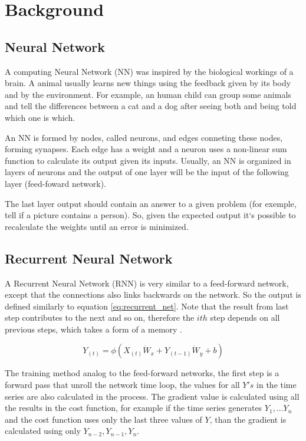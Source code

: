 \section{Background}
\label{sec:background}

\subsection{Neural Network}
A computing Neural Network (NN) was inspired by the biological workings of a brain. A animal usually learns new things using the feedback given by its body and by the environment. For example, an human child can group some animals and tell the differences between a cat and a dog after seeing both and being told which one is which.

An NN is formed by nodes, called neurons, and edges conneting these nodes, forming synapses. Each edge has a weight and a neuron uses a non-linear sum function to calculate its output given its inputs. Usually, an NN is organized in layers of neurons and the output of one layer will be the input of the following layer (feed-foward network). 

The last layer output should contain an answer to a given problem (for exemple, tell if a picture contains a person). So, given the expected output it`s possible to recalculate the weights until an error is minimized. 

\subsection{Recurrent Neural Network}

A Recurrent Neural Network (RNN) is very similar to a feed-forward network, 
except that the connections also links backwards on the network.
So the output is defined similarly to equation \ref{eq:recurrent_net}.
Note that the result from last step contributes to the next and so on,
therefore the $ith$ step depends on all previous steps,
which takes a form of a memory \cite{geron2017hands}.

\begin{equation}
\label{eq:recurrent_net}
Y_{(t)} = \phi(X_{(t)} \dot W_x + Y_{(t-1)} \dot W_y + b)
\end{equation}

The training method analog to the feed-forward networks,
the first step is a forward pass that unroll the network time loop,
the values for all $Y's$ in the time series are also calculated in the process.
The gradient value is calculated using all the results in the cost function,
for example if the time series generates $Y_1, \dots Y_n$ and the cost function uses only the last three values of $Y$,
than the gradient is calculated using only $Y_{n-2}, Y_{n-1} , Y_n$.

